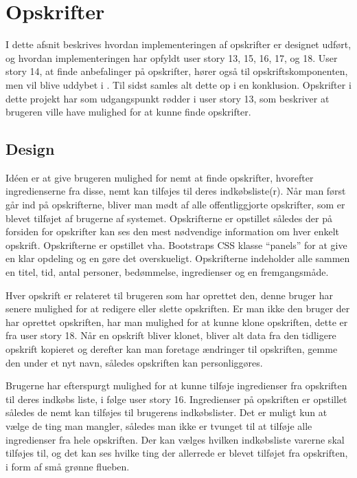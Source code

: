 \section{Opskrifter}
I dette afsnit beskrives hvordan implementeringen af opskrifter er designet udført, og hvordan implementeringen har opfyldt user story 13, 15, 16, 17, og 18. 
User story 14, at finde anbefalinger på opskrifter, hører også til opskriftskomponenten, men vil blive uddybet i . Til sidst samles alt dette op i en konklusion. 
Opskrifter i dette projekt har som udgangspunkt rødder i user story 13, som beskriver at brugeren ville have mulighed for at kunne finde opskrifter.
\subsection{Design}
Idéen er at give brugeren mulighed for nemt at finde opskrifter, hvorefter ingredienserne fra disse, nemt kan tilføjes til deres indkøbsliste(r).
Når man først går ind på opskrifterne, bliver man mødt af alle offentliggjorte opskrifter, som er blevet tilføjet af brugerne af systemet.
Opskrifterne er opstillet således der på forsiden for opskrifter kan ses den mest nødvendige information om hver enkelt opskrift.
Opskrifterne er opstillet vha. Bootstraps CSS klasse ``panels'' for at give en klar opdeling og en gøre det overskueligt.
Opskrifterne indeholder alle sammen en titel, tid, antal personer, bedømmelse, ingredienser og en fremgangsmåde.

Hver opskrift er relateret til brugeren som har oprettet den, denne bruger har senere mulighed for at redigere eller slette opskriften.
Er man ikke den bruger der har oprettet opskriften, har man mulighed for at kunne klone opskriften, dette er fra user story 18.
Når en opskrift bliver klonet, bliver alt data fra den tidligere opskrift kopieret og derefter kan man foretage ændringer til opskriften, gemme den under et nyt navn, således opskriften kan personliggøres.

Brugerne har efterspurgt mulighed for at kunne tilføje ingredienser fra opskriften til deres indkøbs liste, i følge user story 16.
Ingredienser på opskriften er opstillet således de nemt kan tilføjes til brugerens indkøbslister.
Det er muligt kun at vælge de ting man mangler, således man ikke er tvunget til at tilføje alle ingredienser fra hele opskriften.
Der kan vælges hvilken indkøbsliste varerne skal tilføjes til, og det kan ses hvilke ting der allerrede er blevet tilføjet fra opskriften, i form af små grønne flueben.


